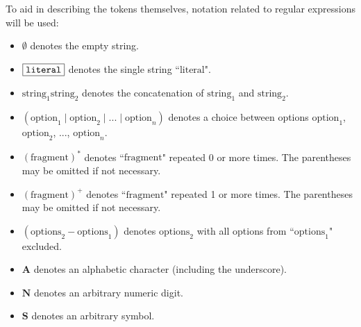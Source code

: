\documentclass{article}
\newcommand{\literal}[1]{\fbox{\texttt{#1}}}
\newcommand{\sor}{\;\big|\;}
\begin{document}
To aid in describing the tokens themselves, notation related to regular expressions will be used:
\begin{itemize}
\item \(\emptyset\) denotes the empty string.
\item \(\literal{literal}\) denotes the single string ``\(\text{literal}\)". 
\item \(\text{string}_1\text{string}_2\) denotes the concatenation of \(\text{string}_1\) and \(\text{string}_2\).
\item \((\text{option}_1\sor\text{option}_2\sor...\sor\text{option}_n)\) denotes a choice between options \(\text{option}_1\), \(\text{option}_2\), ..., \(\text{option}_n\).
\item \((\text{fragment})^*\) denotes ``\(\text{fragment}\)" repeated 0 or more times. The parentheses may be omitted if not necessary.
\item \((\text{fragment})^+\) denotes ``\(\text{fragment}\)" repeated 1 or more times. The parentheses may be omitted if not necessary.
\item \((\text{options}_2-\text{options}_1)\) denotes \(\text{options}_2\) with all options from ``\(\text{options}_1\)" excluded.
\item \(\mathbf{A}\) denotes an alphabetic character (including the underscore).
\item \(\mathbf{N}\) denotes an arbitrary numeric digit.
\item \(\mathbf{S}\) denotes an arbitrary symbol. 
\end{itemize}
\end{document}
